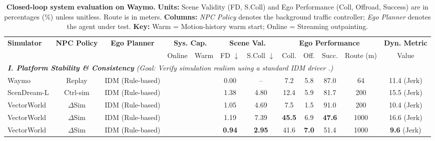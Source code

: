 \documentclass{article}
\newcommand{\cmark}{\textcolor{mydarkgray}{\ding{51}}}
\newcommand{\xmark}{\textcolor{mylightgray}{\ding{55}}}
\theoremstyle{plain}
\theoremstyle{definition}
\theoremstyle{remark}
\begin{document}
\begin{table}[t]
  \centering
  \small
  \caption{\textbf{Closed-loop system evaluation on Waymo.} 
  \textbf{Units:} Scene Validity (FD, S.Coll) and Ego Performance (Coll, Offroad, Success) are in percentages (\%) unless unitless. Route is in meters. 
  \textbf{Columns:} \textit{NPC Policy} denotes the background traffic controller; \textit{Ego Planner} denotes the agent under test. 
  \textbf{Key:} Warm = Motion-history warm start; Online = Streaming outpainting.}
  \label{tab:closed_loop_eval}
  
  \setlength{\tabcolsep}{3.5pt} 
  \renewcommand{\arraystretch}{0.95}

  \begin{tabular}{@{} lcccc cc cccc c @{}}
    \toprule
    \multirow{2}{*}{\textbf{Simulator}} & 
    \multirow{2}{*}{\textbf{NPC Policy}} & 
    \multirow{2}{*}{\textbf{Ego Planner}} & 
    \multicolumn{2}{c}{\textbf{Sys. Cap.}} & 
    \multicolumn{2}{c}{\textbf{Scene Val.}} & 
    \multicolumn{4}{c}{\textbf{Ego Performance}} & 
    \textbf{Dyn. Metric} \\
    \cmidrule(lr){4-5} \cmidrule(lr){6-7} \cmidrule(lr){8-11} \cmidrule(lr){12-12}
    
    & & & Online & Warm 
    & FD $\downarrow$ & S.Coll $\downarrow$ 
    & Coll. & Off. & Succ. & Route (m) 
    & Value \\

    \midrule
    \multicolumn{12}{l}{\cellcolor{gray!10}\textit{\textbf{I. Platform Stability \& Consistency} (Goal: Verify simulation realism using a standard IDM driver \cite{treiber2000congested}.)}} \\
    \midrule
    
    Waymo & Replay & IDM (Rule-based) & \xmark & \xmark & 0.00 & -- & 7.2 & 5.8 & 87.0 & 64 & 11.4 \scriptsize{(Jerk)} \\
    ScenDream-L & Ctrl-sim & IDM (Rule-based) & \xmark & \xmark & 1.38 & 4.80 & 12.4 & 5.9 & 81.7 & 200 & 15.5 \scriptsize{(Jerk)} \\
    VectorWorld & $\Delta$Sim & IDM (Rule-based) & \xmark & \xmark & 1.05 & 4.69 & 7.5 & 1.5 & 91.0 & 200 & 10.4 \scriptsize{(Jerk)} \\
    VectorWorld & $\Delta$Sim & IDM (Rule-based) & \cmark & \xmark & 1.19 & 7.39 & \textbf{45.5} & 6.9 & \textbf{47.6} & 1000 & 16.6 \scriptsize{(Jerk)} \\
    \rowcolor{blue!5}
    VectorWorld & $\Delta$Sim & IDM (Rule-based) & \cmark & \cmark & \textbf{0.94} & \textbf{2.95} & 41.6 & \textbf{7.0} & 51.4 & 1000 & \textbf{9.6} \scriptsize{(Jerk)} \\


\end{tabular}
\end{table}
\end{document}

